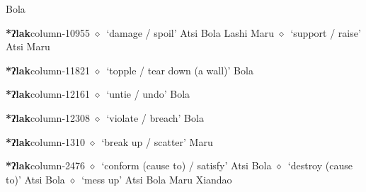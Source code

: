          Bola 
  \item {\footnotesize \textbf{*ʔlak}}{\tiny column-10955}
         $\diamond$~`damage / spoil'
         Atsi 
\hspace{1ex}
         Bola 
\hspace{1ex}
         Lashi 
\hspace{1ex}
         Maru 
\hspace{1ex}
         $\diamond$~`support / raise'
         Atsi 
\hspace{1ex}
         Maru 
  \item {\footnotesize \textbf{*ʔlak}}{\tiny column-11821}
         $\diamond$~`topple / tear down (a wall)'
         Bola 
  \item {\footnotesize \textbf{*ʔlak}}{\tiny column-12161}
         $\diamond$~`untie / undo'
         Bola 
  \item {\footnotesize \textbf{*ʔlak}}{\tiny column-12308}
         $\diamond$~`violate / breach'
         Bola 
  \item {\footnotesize \textbf{*ʔlak}}{\tiny column-1310}
         $\diamond$~`break up / scatter'
         Maru 
  \item {\footnotesize \textbf{*ʔlak}}{\tiny column-2476}
         $\diamond$~`conform (cause to) / satisfy'
         Atsi 
\hspace{1ex}
         Bola 
\hspace{1ex}
         $\diamond$~`destroy (cause to)'
         Atsi 
\hspace{1ex}
         Bola 
\hspace{1ex}
         $\diamond$~`mess up'
         Atsi 
\hspace{1ex}
         Bola 
\hspace{1ex}
         Maru 
\hspace{1ex}
         Xiandao 
